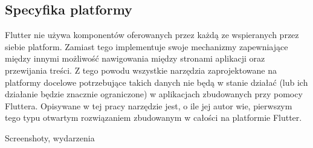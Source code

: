 \subsection{Specyfika platformy}
Flutter nie używa komponentów oferowanych przez każdą ze wspieranych przez siebie platform. Zamiast tego implementuje swoje mechanizmy zapewniające między innymi możliwość nawigowania między stronami aplikacji oraz przewijania treści. Z tego powodu wszystkie narzędzia zaprojektowane na platformy docelowe potrzebujące takich danych nie będą w stanie działać (lub ich działanie będzie znacznie ograniczone) w aplikacjach zbudowanych przy pomocy Fluttera. Opisywane w tej pracy narzędzie jest, o ile jej autor wie, pierwszym tego typu otwartym rozwiązaniem zbudowanym w całości na platformie Flutter.

Screenshoty, wydarzenia


